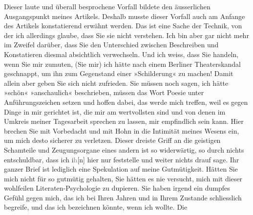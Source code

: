 \begin{ledgroupsized}[t]{13cm}
               Dieser laute und überall besprochene Vorfall bildete den äusserlichen Ausgangspunkt
               meines Artikels. Deshalb
               musste dieser Vorfall auch am Anfange des Artikels konstatierend erwähnt werden. Das ist eine Sache
               der Technik, von der ich allerdings glaube, dass Sie sie nicht verstehen. Ich bin
               aber gar nicht mehr im Zweifel darüber, dass Sie den Unterschied zwischen Beschreiben
               und Konstatieren diesmal absichtlich verwechseln. Und ich weiss, dass Sie \label{K_L03438-9v}\label{K_L03438-9h}
               handeln, wenn Sie mir zumuten, (Sie mir) ich hätte nach einem Berliner Theaterskandal geschnappt, um ihn zum Gegenstand einer
               »Schilderung« zu machen!\pend
           \pstart
           Damit allein aber geben Sie sich nicht zufrieden. Sie müssen noch sagen, ich hätte
               »schön« »anschaulich« beschrieben, müssen das Wort Poesie unter Anführungszeichen
               setzen und hoffen dabei, das werde mich treffen, weil es gegen Dinge in mir gerichtet
               ist, die mir am wertvollsten sind und von denen im Umkreis meiner Tagesarbeit
               sprechen zu lassen, mir empfindlich sein kann. {\pb}Hier brechen Sie mit Vorbedacht
               und mit Hohn in die Intimität meines Wesens ein, um mich desto sicherer zu verletzen.
               Dieser dreiste Griff an die geistigen Schamteile und Zeugungsorgane eines andern ist
               so widerwärtig, so durch nichts entschuldbar, dass ich i\textcolor{gray}{h}{[}n{]} hier nur feststelle und weiter nichts drauf sage.\pend
           \pstart
           Ihr ganzer Brief ist lediglich eine Spekulation auf meine Gutmütigkeit. Hätten Sie
               mich nicht für so gutmütig gehalten, Sie hätten es nie versucht, mich mit dieser
               wohlfeilen Literaten-Psychologie zu dupieren.\pend
           \pstart
           Sie haben irgend ein dumpfes Gefühl gegen mich, das ich bei Ihren Jahren und in Ihrem
               Zustande schliesslich begreife, und das ich bezeichnen könnte, wenn ich wollte. Die

\end{ledgroupsized}

